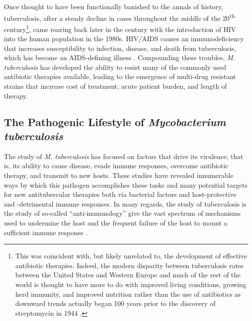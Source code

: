Once thought to have been functionally banished to the annals of history, tuberculosis, after a steady decline in cases throughout the middle of the 20\textsuperscript{th} century\footnote{This was coincident with, but likely unrelated to, the development of effective antibiotic therapies. Indeed, the modern disparity between tuberculosis rates between the United States and Western Europe and much of the rest of the world is thought to have more to do with improved living conditions, growing herd immunity, and improved nutrition rather than the use of antibiotics as downward trends actually began 100 years prior to the discovery of streptomycin in 1944 \citep{Lowbury1958}.}, came roaring back later in the century with the introduction of HIV into the human population in the 1980s. HIV/AIDS causes an immunodeficiency that increases susceptibility to infection, disease, and death from tuberculosis, which has become an AIDS\hyp{}defining illness \citep{Drobniewski1995, Selwyn1992}. Compounding these troubles, \textit{M. tuberculosis} has developed the ability to resist many of the commonly used antibiotic therapies available, leading to the emergence of multi\hyp{}drug resistant strains that increase cost of treatment, acute patient burden, and length of therapy.

\subsection{The Pathogenic Lifestyle of \textit{Mycobacterium tuberculosis}}\label{path:tb}

The study of \textit{M. tuberculosis} has focused on factors that drive its virulence; that is, its ability to cause disease, evade immune responses, overcome antibiotic therapy, and transmit to new hosts. These studies have revealed innumerable ways by which this pathogen accomplishes these tasks and many potential targets for new antitubercular therapies both via bacterial factors and host\hyp{}protective and \hyp{}detrimental immune responses. In many regards, the study of tuberculosis is the study of so\hyp{}called ``anti\hyp{}immunology'' give the vast spectrum of mechanisms used to undermine the host and the frequent failure of the host to mount a sufficient immune response \citep{Diacovich2010, Finlay2006}.

